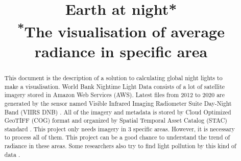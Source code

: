 \documentclass[conference]{IEEEtran}
\begin{document}
 
 
  
\title{Earth at night*\\
{\footnotesize \textsuperscript{*}The visualisation of average radiance in specific area}
}
 
\author{
\and
{}
\and
{}
\and
{}
\and
{}
}  

\maketitle

\begin{abstract}

This document is the description of a solution to calculating global night lights to make a visualisation. World Bank Nightime Light Data consists of a lot of satellite imagery 
stored in Amazon Web Services (AWS). Latest files from 2012 to 2020 are generated by the sensor 
named Visible Infrared Imaging Radiometer Suite Day-Night Band (VIIRS DNB) \cite{WorldBan13:online}. All of the imagery and metadata is  
stored by Cloud Optimized GeoTIFF (COG) \cite{CloudOpt5:online} format and organized by Spatial Temporal Asset Catalog (STAC) standard \cite{SpatioTe90:online}. 
This project only needs imagery in 3 specific areas. However, it is necessary to process all of them. 
This project can be a good chance to understand the trend of radiance in these areas. Some researchers also try to find light pollution by this kind of data \cite{BARA2020106658}. 

\end{abstract}
\end{document}
